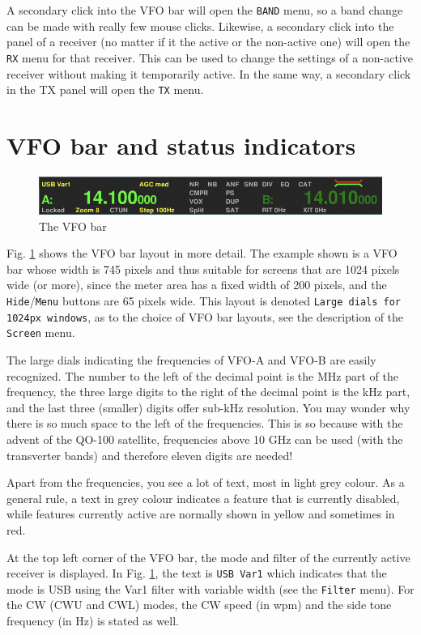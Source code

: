 \documentclass[12pt]{book}
\def\rett#1{\texttt{\color{red}#1}}
\def\bltt#1{\texttt{\color{blue}#1}}
\begin{document}
A secondary click into the VFO bar will open the \bltt{BAND} menu,
so a band change can be made with really few mouse clicks. Likewise,
a secondary click into the panel of a receiver (no matter if it
the active or the non-active one) will open the \bltt{RX} menu
for that receiver. This can be used to change the settings of a
non-active receiver without making it temporarily active. In the
same way, a secondary click in the TX panel will open the
\bltt{TX} menu.

\section{VFO bar and status  indicators}
\begin{figure}[h]
\center
\includegraphics[width=12cm]{VFObar.png}
\caption{The VFO bar}
\label{fig:VFObar}
\end{figure}

Fig. \ref{fig:VFObar} shows the VFO bar layout in more  detail.
The example shown is a VFO bar whose width is 745 pixels and
thus suitable for screens that are 1024 pixels wide (or more),
since the meter area has a fixed width of 200 pixels, and
the \rett{Hide}/\rett{Menu} buttons are 65 pixels wide. This layout is
denoted \texttt{Large dials for 1024px windows}, as to the choice
of VFO bar layouts, see the description of the \bltt{Screen} menu.

The large dials indicating the frequencies of VFO-A and VFO-B
are easily recognized. The number to the left of the decimal
point is the MHz part of the frequency, the three  large digits
to the right  of  the decimal point is the kHz part, and
the last three (smaller) digits offer sub-kHz resolution.
You may wonder why there is  so much space to the left of
the frequencies. This is so because with the advent of
the QO-100 satellite, frequencies above 10 GHz can be
used (with the transverter bands) and therefore eleven
digits are needed!

Apart from the frequencies, you see a lot  of text, most in
light grey colour. As a general rule, a text  in grey
colour indicates a feature that is currently disabled,
while features currently active are normally shown in
yellow and sometimes in red.

At the top left  corner of the VFO bar, the mode and
filter of the currently active receiver is displayed. 
In Fig. \ref{fig:VFObar}, the text is \rett{USB Var1}
which indicates that the  mode
is USB using the Var1 filter with variable width (see the \bltt{Filter} menu).
For the CW (CWU and CWL) modes, the CW speed (in wpm) and the side tone
frequency (in Hz) is stated as well.
\end{document}
